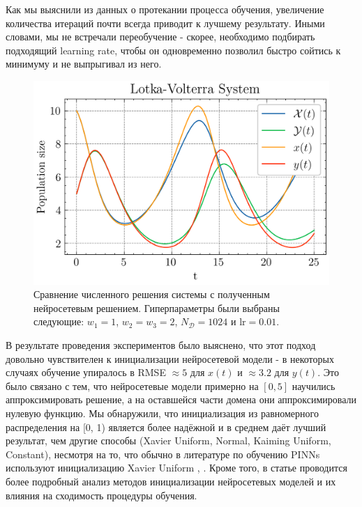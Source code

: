 \documentclass[a4paper, 12pt]{article}
\begin{document}
Как мы выяснили из данных о протекании процесса обучения, увеличение количества итераций почти всегда приводит к лучшему результату. Иными словами, мы не встречали переобучение - скорее, необходимо подбирать подходящий learning rate, чтобы он одновременно позволил быстро сойтись к минимуму и не выпрыгивал из него.

\begin{figure}
    \centering
    \includegraphics{../Differential Equation Solution/images/lotkavolterra/first approach/Lotka-Volterra System.png}
    \caption{Сравнение численного решения системы с полученным нейросетевым решением. Гиперпараметры были выбраны следующие: $w_1 = 1$, $w_2 = w_3 = 2$, $N_\mathcal{D} = 1024$ и $\mathrm{lr} = 0.01$.}
    \label{fig:lotkavolterra:first:solution}
\end{figure}

В результате проведения экспериментов было выяснено, что этот подход довольно чувствителен к инициализации нейросетевой модели - в некоторых случаях обучение упиралось в RMSE $\approx 5$ для $x(t)$ и $\approx 3.2$ для $y(t)$. Это было связано с тем, что нейросетевые модели примерно на $[0, 5]$ научились аппроксимировать решение, а на оставшейся части домена они аппроксимировали нулевую функцию. Мы обнаружили, что инициализация из равномерного распределения на [0, 1) является более надёжной и в среднем даёт лучший результат, чем другие способы (Xavier Uniform, Normal, Kaiming Uniform, Constant), несмотря на то, что обычно в литературе по обучению PINNs используют инициализацию Xavier Uniform \cite{rathore2024challenges}, \cite{wang2020pinns}. Кроме того, в статье \cite{Pang_2019} проводится более подробный анализ методов инициализации нейросетевых моделей и их влияния на сходимость процедуры обучения.
\end{document}
